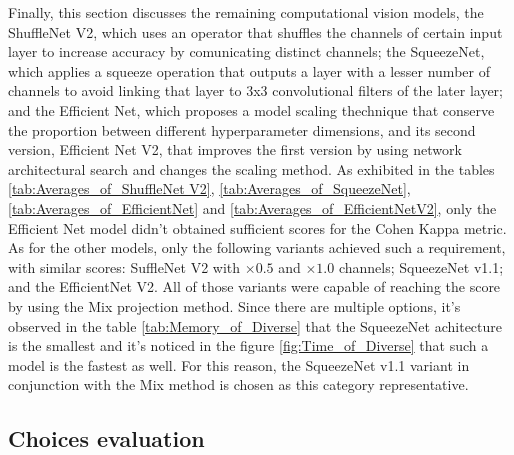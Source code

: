 Finally, this section discusses the remaining computational vision models, the ShuffleNet V2, which uses an operator that shuffles the channels of certain input layer to increase accuracy by comunicating distinct channels; the SqueezeNet, which applies a squeeze operation that outputs a layer with a lesser number of channels to avoid linking that layer to 3x3 convolutional filters of the later layer; and the Efficient Net, which proposes a model scaling thechnique that conserve the proportion between different hyperparameter dimensions, and its second version, Efficient Net V2, that improves the first version by using network architectural search and changes the scaling method. As exhibited in the tables \ref{tab:Averages_of_ShuffleNet V2}, \ref{tab:Averages_of_SqueezeNet}, \ref{tab:Averages_of_EfficientNet} and \ref{tab:Averages_of_EfficientNetV2}, only the Efficient Net model didn't obtained sufficient scores for the Cohen Kappa metric. As for the other models, only the following variants achieved such a requirement, with similar scores: SuffleNet V2 with $\times 0.5$ and $\times 1.0$ channels; SqueezeNet v1.1; and the EfficientNet V2. All of those variants were capable of reaching the score by using the \acrshort{Mix} projection method. Since there are multiple options, it's observed in the table \ref{tab:Memory_of_Diverse} that the SqueezeNet achitecture is the smallest and it's noticed in the figure \ref{fig:Time_of_Diverse} that such a model is the fastest as well. For this reason, the SqueezeNet v1.1 variant in conjunction with the \acrshort{Mix} method is chosen as this category representative.

\pagebreak

\subsection{Choices evaluation}


